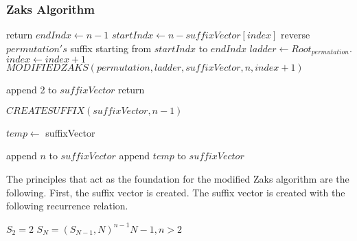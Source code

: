 \subsubsection{Zaks Algorithm}
\begin{algorithm}
  \begin{algorithmic}[1]
        \State return
      \EndIf
        \State $endIndx \gets n-1$
        \State $startIndx \gets n-suffixVector[index]$
        \State reverse $permutation's$ suffix starting from $startIndx$ to $endIndx$
        \State $ladder \gets Root_{permutation}$.
        \State $index \gets index+1$
        \State$MODIFIEDZAKS(permutation, ladder, suffixVector, n, index+1)$ 


    \EndFunction
  
  
  \end{algorithmic}

\end{algorithm}


\begin{algorithm}
  \begin{algorithmic}[1]
        \State append 2 to $suffixVector$
        \State return
      \EndIf

        $CREATESUFFIX(suffixVector, n-1)$
        
        $temp \gets$ suffixVector

          \State append $n$ to $suffixVector$
          \State append $temp$ to $suffixVector$
        \EndFor
    \EndFunction
  \end{algorithmic}
\end{algorithm}\pagebreak

The principles that act as the foundation for the modified Zaks 
algorithm are the following. First, the suffix vector is created. 
The suffix vector is created with the following recurrence relation.
\begin{center}
  $S_{2} = 2$\newline
  $S_{N} = (S_{N-1},N)^{n-1}N-1, n>2$\newline
\end{center}


